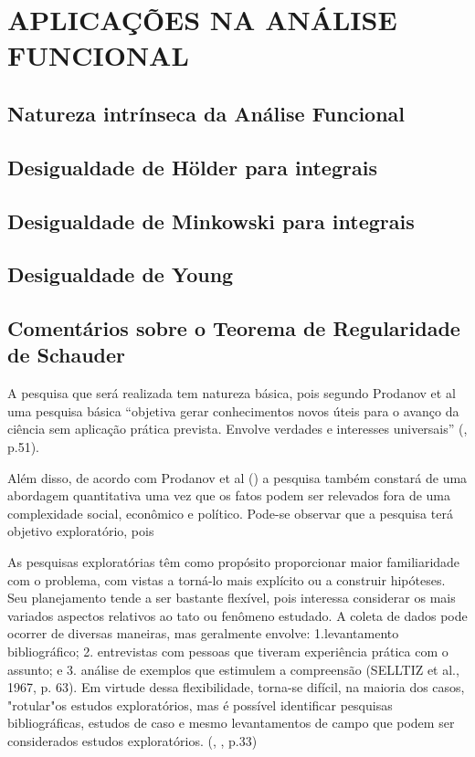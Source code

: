 \chapter{APLICAÇÕES NA ANÁLISE FUNCIONAL}
    \section{Natureza intrínseca da Análise Funcional}
    \section{Desigualdade de Hölder para integrais}
    \section{Desigualdade de Minkowski para integrais}
    \section{Desigualdade de Young}
    \section{Comentários sobre o Teorema de Regularidade de Schauder}
 A pesquisa que será realizada tem natureza básica, pois segundo Prodanov et al uma pesquisa básica
 \enquote{objetiva gerar conhecimentos novos úteis para o avanço da ciência sem aplicação prática prevista. Envolve verdades e interesses universais} (\citeyear{profreitas}, p.51). 

 Além disso, de acordo com Prodanov et al (\citeyear{profreitas}) a pesquisa também constará de uma abordagem quantitativa uma vez que os fatos podem ser relevados fora de uma complexidade social, econômico e político. Pode-se observar que a pesquisa terá objetivo exploratório, pois 

 \begin{citlon}
     As pesquisas exploratórias têm como propósito proporcionar maior familiaridade com o problema, com vistas a torná-lo mais explícito ou a construir hipóteses. 
     Seu planejamento tende a ser bastante flexível, pois interessa considerar os mais variados aspectos relativos ao tato ou fenômeno estudado.
     A coleta de dados pode ocorrer de diversas maneiras, mas geralmente envolve: 1.levantamento bibliográfico;
     2. entrevistas com pessoas que tiveram experiência prática com o assunto; 
     e 3. análise de exemplos que estimulem a compreensão (SELLTIZ et al., 1967, p. 63). 
     Em virtude dessa flexibilidade, torna-se difícil, na maioria dos casos, "rotular"os estudos exploratórios, mas é possível identificar pesquisas bibliográficas, estudos de caso e mesmo levantamentos de campo que podem ser considerados estudos exploratórios. (\citeauthor{gil}, \citeyear{gil}, p.33)
 \end{citlon}

